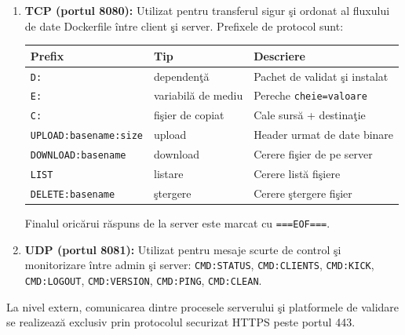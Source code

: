 \documentclass[12pt, a4paper]{article}
\begin{document}
\begin{enumerate}
    \item \textbf{TCP (portul 8080):} Utilizat pentru transferul sigur \c{s}i ordonat al fluxului
    de date Dockerfile \^{i}ntre client \c{s}i server. Prefixele de protocol sunt:

    \begin{center}
    \begin{tabular}{lll}
    \toprule
    \textbf{Prefix} & \textbf{Tip} & \textbf{Descriere} \\
    \midrule
    \texttt{D:}                   & dependen\c{t}\u{a}        & Pachet de validat \c{s}i instalat \\
    \texttt{E:}                   & variabil\u{a} de mediu    & Pereche \texttt{cheie=valoare} \\
    \texttt{C:}                   & fi\c{s}ier de copiat       & Cale surs\u{a} + destina\c{t}ie \\
    \texttt{UPLOAD:basename:size} & upload                    & Header urmat de date binare \\
    \texttt{DOWNLOAD:basename}    & download                  & Cerere fi\c{s}ier de pe server \\
    \texttt{LIST}                 & listare                   & Cerere list\u{a} fi\c{s}iere \\
    \texttt{DELETE:basename}      & \c{s}tergere               & Cerere \c{s}tergere fi\c{s}ier \\
    \bottomrule
    \end{tabular}
    \end{center}

    Finalul oric\u{a}rui r\u{a}spuns de la server este marcat cu \texttt{===EOF===}.

    \item \textbf{UDP (portul 8081):} Utilizat pentru mesaje scurte de control \c{s}i monitorizare
    \^{i}ntre admin \c{s}i server: \texttt{CMD:STATUS}, \texttt{CMD:CLIENTS}, \texttt{CMD:KICK},
    \texttt{CMD:LOGOUT}, \texttt{CMD:VERSION}, \texttt{CMD:PING}, \texttt{CMD:CLEAN}.
\end{enumerate}

La nivel extern, comunicarea dintre procesele serverului \c{s}i platformele de validare se
realizeaz\u{a} exclusiv prin protocolul securizat HTTPS peste portul 443.

\end{document}
